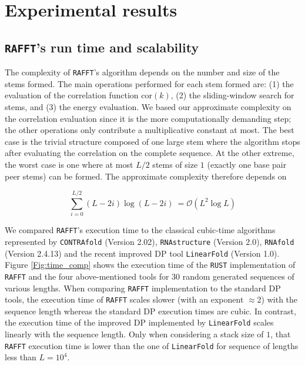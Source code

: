 \section{Experimental results }
\subsection{ \texttt{RAFFT}'s run time and scalability}

The complexity of \texttt{RAFFT}'s algorithm depends on the number and size of the stems formed. The main operations performed for each stem formed are: (1) the evaluation of the correlation function \(\text{cor}(k)\), (2) the sliding-window search for stems, and (3) the energy evaluation. We based our approximate complexity on the correlation evaluation since it is the more computationally demanding step; the other operations only contribute a multiplicative constant at most. The best case is the trivial structure composed of one large stem where the algorithm stops after evaluating the correlation on the complete sequence. At the other extreme, the worst case is one where at most \(L/2\) stems of size $1$ (exactly one base pair peer stems) can be formed. The approximate complexity therefore depends on 

\begin{equation}
	\label{Eq:complexity}
	\sum_{i=0}^{L/2} (L-2i) \log(L-2i) \ = \mathcal{O}(L^2\log{L})
\end{equation}

We compared \texttt{RAFFT}'s execution time to the classical cubic-time algorithms represented by \texttt{CONTRAfold} (Version 2.02), \texttt{RNAstructure} (Version 2.0), \texttt{RNAfold} (Version 2.4.13) and the recent improved DP tool \texttt{LinearFold} (Version 1.0). Figure \ref{Fig:time_comp} shows the execution time of the \texttt{RUST} implementation of \texttt{RAFFT} and the four above-mentioned tools for $30$ random generated sequences of various lengths.  When comparing \texttt{RAFFT} implementation to the standard DP tools, the execution time of \texttt{RAFFT} scales slower (with an exponent $\approx 2$) with the sequence length whereas the standard DP execution times are cubic. In contrast, the execution time of the improved DP implemented by \texttt{LinearFold} scales linearly with the sequence length. Only when considering a stack size of $1$, that \texttt{RAFFT} execution time is lower than the one of \texttt{LinearFold} for sequence of lengths less than $L=10^4$.

